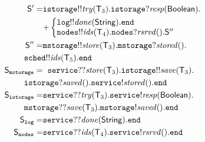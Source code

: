 \begin{align*}
\hspace{20mm}
\ST' = &
\mathtt{istorage}{!!}\mathit{try}(\T_3).\mathtt{istorage}{?}\mathit{resp}(\mathsf{Boolean}).\\
&
{+}
\left\{
\begin{array}{@{}l@{}}
\mathtt{log}{!!}\mathit{done}(\mathsf{String}).\tend\\
\mathtt{nodes}{!!}\mathit{ids}(\T_4).\mathtt{nodes}{?}\mathit{rsrvd}().\ST''\\
\end{array} \right.\\
%
\hspace{-8mm}
\ST'' = & 
\mathtt{mstorage}{!!}\mathit{store}(\T_3).\mathtt{mstorage}{?}\mathit{stored}().\\ & \hspace{-8mm}
\mathtt{sched}{!!}\mathit{ids}(\T_5).\tend\\
%
\hspace{-8mm}
\ST_\mathtt{mstorage} =  & \hspace{2mm}
\mathtt{service}{??}\mathit{store}(\T_3).\mathtt{istorage}{!!}\mathit{save}(\T_3).\\ & \hspace{-8mm}
\mathtt{istorage}{?}\mathit{saved}().\mathtt{service}{!}\mathit{stored}().\tend\\
%
\hspace{-8mm}
\ST_\mathtt{istorage} =  &
\mathtt{service}{??}\mathit{try}(\T_3).\mathtt{service}{!}\mathit{resp}(\mathsf{Boolean}).\\ & \hspace{-8mm}
\mathtt{mstorage}{??}\mathit{save}(\T_3).\mathtt{mstorage}{!}\mathit{saved}().\tend\\
%
\hspace{-8mm}
\ST_\mathtt{log} =  &
\mathtt{service}{??}\mathit{done}(\mathsf{String}).\tend\\
%
\ST_\mathtt{nodes} =  &
\mathtt{service}{??}\mathit{ids}(\T_4).\mathtt{service}{!}\mathit{rsrvd}().\tend\\
\end{align*}


